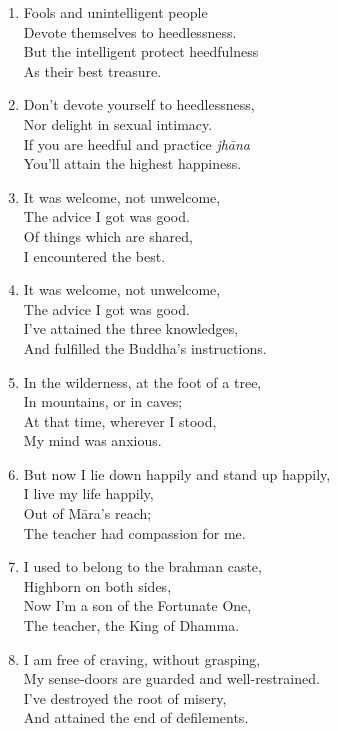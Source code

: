 \documentclass[10pt, openany]{book}
\begin{document}
\begin{enumerate}
\item Fools and unintelligent people\\
Devote themselves to heedlessness.\\
But the intelligent protect heedfulness\\
As their best treasure.

\item Don’t devote yourself to heedlessness,\\
Nor delight in sexual intimacy.\\
If you are heedful and practice \emph{jhāna}\\
You’ll attain the highest happiness.

\item It was welcome, not unwelcome,\\
The advice I got was good.\\
Of things which are shared,\\
I encountered the best.

\item It was welcome, not unwelcome,\\
The advice I got was good.\\
I’ve attained the three knowledges,\\
And fulfilled the Buddha’s instructions.

\item In the wilderness, at the foot of a tree,\\
In mountains, or in caves;\\
At that time, wherever I stood,\\
My mind was anxious.

\item But now I lie down happily and stand up happily,\\
I live my life happily,\\
Out of Māra’s reach;\\
The teacher had compassion for me.

\item I used to belong to the brahman caste,\\
Highborn on both sides,\\
Now I’m a son of the Fortunate One,\\
The teacher, the King of Dhamma.

\item I am free of craving, without grasping,\\
My sense-doors are guarded and well-restrained.\\
I’ve destroyed the root of misery,\\
And attained the end of defilements.


\end{enumerate}
\end{document}
